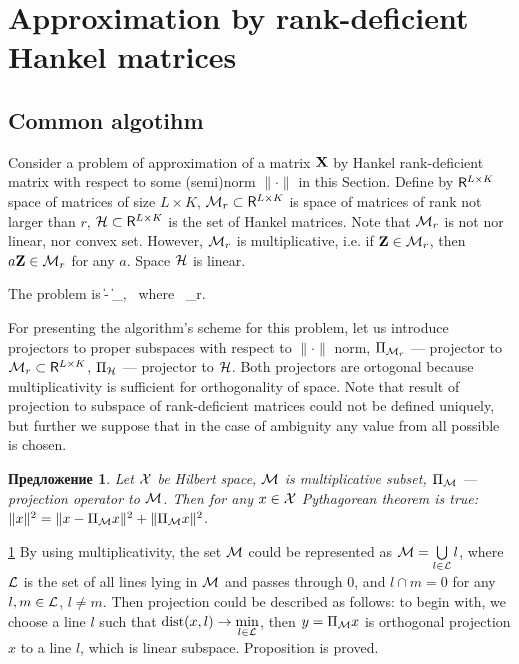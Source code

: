 \documentclass[12pt,a4paper,fleqn,leqno]{article}
\newtheorem{proposition}{Предложение}
\begin{document}
\section{Approximation by rank-deficient Hankel matrices}
\label{sec:lowrank_appr}
\subsection{Common algotihm}
Consider a problem of approximation of a matrix $\mathbf{X}$ by Hankel rank-deficient matrix with respect to some (semi)norm $\|\cdot\|$ in this Section. Define by $\mathsf{R}^{L\times K}$ space of matrices of size $L \times K$, $\mathcal{M}_r\subset \mathsf{R}^{L\times K}$ is space of matrices of rank not larger than $r$,
$\mathcal{H} \subset \mathsf{R}^{L\times K}$ is the set of Hankel matrices.
Note that  $\mathcal{M}_r$ is not nor linear, nor convex set. However, $\mathcal{M}_r$ is multiplicative, i.e.
if $\mathbf{Z}\in \mathcal{M}_r$, then $a\mathbf{Z}\in \mathcal{M}_r$ for any $a$.
Space $\mathcal{H}$ is linear.

The problem is
\be
\label{eq:gen_task}
\|\bfX - \bfY\| \to \min_\bfY, \mbox{\ where\ } \bfY \in \calH \cap \calM_r.
\ee

For presenting the algorithm's scheme for this problem, let us introduce projectors to proper subspaces with respect to $\|\cdot\|$ norm, $\Pi_{\mathcal{M}_r}$ --- projector to $\mathcal{M}_r\subset \mathsf{R}^{L\times K}$,
$\Pi_{\mathcal{H}}$ --- projector to $\mathcal{H}$.
Both projectors are ortogonal because multiplicativity is sufficient for  orthogonality of space. Note that result of projection to subspace of rank-deficient matrices could not be defined uniquely, but further we suppose that in the case of ambiguity any value from all possible is chosen.

\begin{proposition} \label{pythaprop}
Let $\mathcal{X}$ be Hilbert space, $\mathcal{M}$ is multiplicative subset, $\Pi_{\mathcal{M}}$ --- projection operator to $\mathcal{M}$. Then for any $x \in \mathcal{X}$ Pythagorean theorem is true: $\|x\|^2 = \|x - \Pi_{\mathcal{M}} x\|^2 + \|\Pi_{\mathcal{M}} x\|^2$.
\end{proposition}
\begin{proof5}{\ref{pythaprop}}
By using multiplicativity, the set $\mathcal{M}$ could be represented as $\mathcal{M} = \bigcup\limits_{l \in \mathcal{L}}l$, where $\mathcal{L}$ is the set of all lines lying in $\mathcal{M}$ and passes through $0$, and $l \cap m = 0$ for any $l, m \in \mathcal{L}$, $l \neq m$. Then projection could be described as follows: to begin with, we choose a line $l$ such that $\mathop{\mathrm{dist}}(x, l) \rightarrow \min\limits_{l \in \mathcal{L}}$, then $y = \Pi_{\mathcal{M}} x$ is orthogonal projection $x$ to a line $l$, which is linear subspace. Proposition is proved.
\end{proof5}
\end{document}
